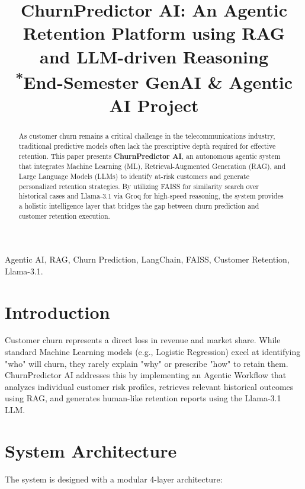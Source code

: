 \documentclass[conference]{IEEEtran}
\begin{document}
\title{ChurnPredictor AI: An Agentic Retention Platform using RAG and LLM-driven Reasoning\\
{\footnotesize \textsuperscript{*}End-Semester GenAI \& Agentic AI Project}}

\author{
}

\maketitle

\begin{abstract}
As customer churn remains a critical challenge in the telecommunications industry, traditional predictive models often lack the prescriptive depth required for effective retention. This paper presents \textbf{ChurnPredictor AI}, an autonomous agentic system that integrates Machine Learning (ML), Retrieval-Augmented Generation (RAG), and Large Language Models (LLMs) to identify at-risk customers and generate personalized retention strategies. By utilizing FAISS for similarity search over historical cases and Llama-3.1 via Groq for high-speed reasoning, the system provides a holistic intelligence layer that bridges the gap between churn prediction and customer retention execution.
\end{abstract}

\begin{IEEEkeywords}
Agentic AI, RAG, Churn Prediction, LangChain, FAISS, Customer Retention, Llama-3.1.
\end{IEEEkeywords}

\section{Introduction}
Customer churn represents a direct loss in revenue and market share. While standard Machine Learning models (e.g., Logistic Regression) excel at identifying "who" will churn, they rarely explain "why" or prescribe "how" to retain them. ChurnPredictor AI addresses this by implementing an Agentic Workflow that analyzes individual customer risk profiles, retrieves relevant historical outcomes using RAG, and generates human-like retention reports using the Llama-3.1 LLM.

\section{System Architecture}
The system is designed with a modular 4-layer architecture:
\end{document}
